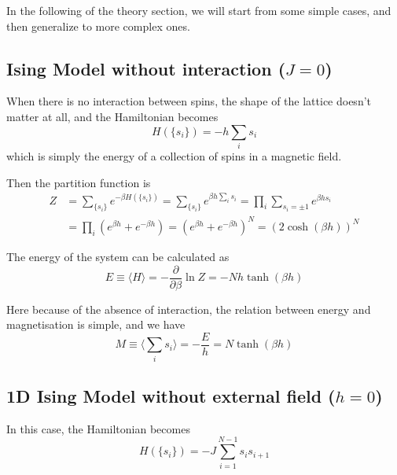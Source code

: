 \documentclass[11pt]{article}
\begin{document}
	In the following of the theory section, we will start from some simple cases, and then generalize to more complex ones.

	\subsection{Ising Model without interaction ($J=0$)}

	When there is no interaction between spins, the shape of the lattice doesn't matter at all, and the Hamiltonian becomes
	\begin{equation} \label{eq:HamiltonianNoInteraction}
		H(\{s_i\}) = -h \sum_i s_i
	\end{equation}
	which is simply the energy of a collection of spins in a magnetic field.

	Then the partition function is
	\begin{equation} \label{eq:PartitionFunctionNoInteraction}
		\begin{aligned}
			Z &= \sum_{\{s_i\}} e^{-\beta H(\{s_i\})} = \sum_{\{s_i\}} e^{\beta h \sum_i s_i} = \prod_i \sum_{s_i=\pm1} e^{\beta h s_i} \\
			&= \prod_i (e^{\beta h} + e^{-\beta h}) = (e^{\beta h} + e^{-\beta h})^N = (2\cosh(\beta h))^N
		\end{aligned}
	\end{equation}

	The energy of the system can be calculated as
	\begin{equation} \label{eq:EnergyNoInteraction}
		E \equiv \langle H \rangle = -\frac{\partial}{\partial \beta} \ln Z = - N h \tanh(\beta h)
	\end{equation}

	Here because of the absence of interaction, the relation between energy and magnetisation is simple, and we have
	\begin{equation} \label{eq:MagnetisationNoInteraction}
		M \equiv \langle \sum_i s_i \rangle = -\frac{E}{h} = N \tanh(\beta h)
	\end{equation}

	\subsection{1D Ising Model without external field ($h=0$)}


	In this case, the Hamiltonian becomes
	\begin{equation} \label{eq:Hamiltonian1DNoField}
		H(\{s_i\}) = -J \sum_{i=1}^{N-1} s_i s_{i+1}
	\end{equation}
\end{document}
